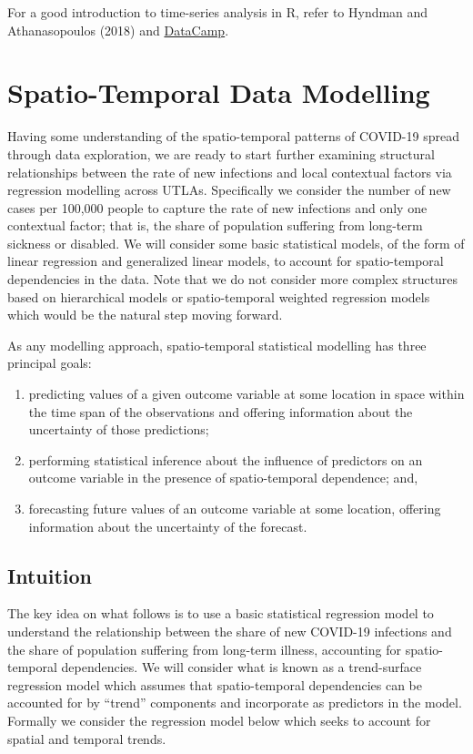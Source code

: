 \documentclass[
  letterpaper,
  DIV=11,
  numbers=noendperiod,
  oneside]{scrreprt}
\begin{document}
For a good introduction to time-series analysis in R, refer to Hyndman
and Athanasopoulos (2018) and
\href{https://www.datacamp.com/courses/forecasting-using-r}{DataCamp}.

\section{Spatio-Temporal Data
Modelling}\label{spatio-temporal-data-modelling}

Having some understanding of the spatio-temporal patterns of COVID-19
spread through data exploration, we are ready to start further examining
structural relationships between the rate of new infections and local
contextual factors via regression modelling across UTLAs. Specifically
we consider the number of new cases per 100,000 people to capture the
rate of new infections and only one contextual factor; that is, the
share of population suffering from long-term sickness or disabled. We
will consider some basic statistical models, of the form of linear
regression and generalized linear models, to account for spatio-temporal
dependencies in the data. Note that we do not consider more complex
structures based on hierarchical models or spatio-temporal weighted
regression models which would be the natural step moving forward.

As any modelling approach, spatio-temporal statistical modelling has
three principal goals:

\begin{enumerate}
\def\labelenumi{\arabic{enumi}.}
\item
  predicting values of a given outcome variable at some location in
  space within the time span of the observations and offering
  information about the uncertainty of those predictions;
\item
  performing statistical inference about the influence of predictors on
  an outcome variable in the presence of spatio-temporal dependence;
  and,
\item
  forecasting future values of an outcome variable at some location,
  offering information about the uncertainty of the forecast.
\end{enumerate}

\subsection{Intuition}\label{intuition}

The key idea on what follows is to use a basic statistical regression
model to understand the relationship between the share of new COVID-19
infections and the share of population suffering from long-term illness,
accounting for spatio-temporal dependencies. We will consider what is
known as a trend-surface regression model which assumes that
spatio-temporal dependencies can be accounted for by ``trend''
components and incorporate as predictors in the model. Formally we
consider the regression model below which seeks to account for spatial
and temporal trends.
\end{document}
